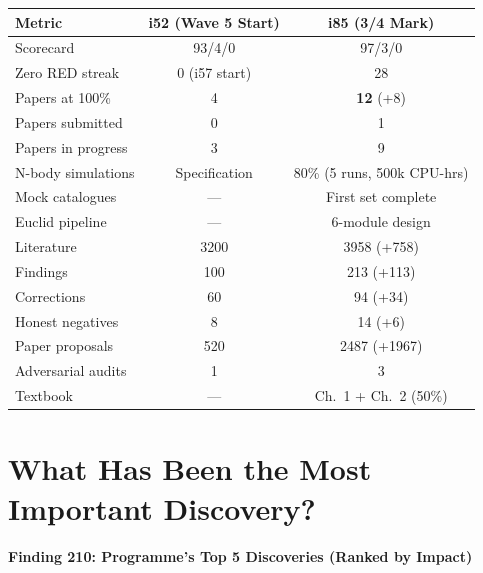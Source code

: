\documentclass[11pt,a4paper]{article}
\begin{document}
\begin{center}
\begin{longtable}{lcc}
\toprule
\textbf{Metric} & \textbf{i52 (Wave 5 Start)} & \textbf{i85 (3/4 Mark)} \\
\midrule
\endhead
Scorecard & 93/4/0 & 97/3/0 \\
Zero RED streak & 0 (i57 start) & 28 \\
Papers at 100\% & 4 & \textbf{12} (+8) \\
Papers submitted & 0 & 1 \\
Papers in progress & 3 & 9 \\
N-body simulations & Specification & 80\% (5 runs, 500k CPU-hrs) \\
Mock catalogues & --- & First set complete \\
Euclid pipeline & --- & 6-module design \\
Literature & 3200 & 3958 (+758) \\
Findings & 100 & 213 (+113) \\
Corrections & 60 & 94 (+34) \\
Honest negatives & 8 & 14 (+6) \\
Paper proposals & 520 & 2487 (+1967) \\
Adversarial audits & 1 & 3 \\
Textbook & --- & Ch.\ 1 + Ch.\ 2 (50\%) \\
\bottomrule
\end{longtable}
\end{center}

\section{What Has Been the Most Important Discovery?}

\textbf{Finding 210: Programme's Top 5 Discoveries (Ranked by Impact)}
\end{document}
